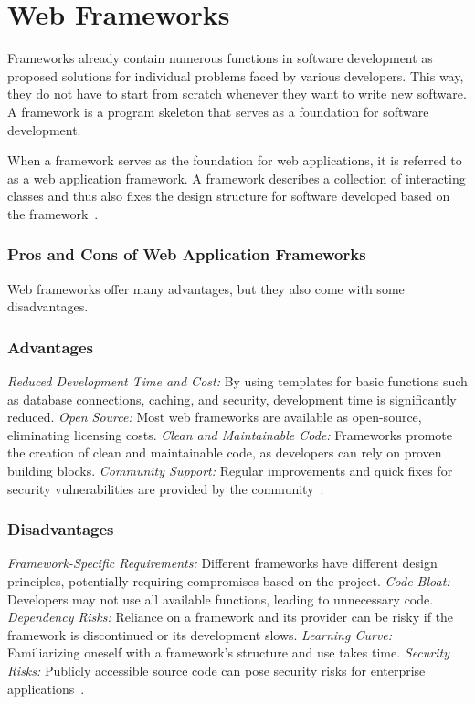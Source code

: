 \section{Web Frameworks}

Frameworks already contain numerous functions in software development as proposed solutions for individual problems faced by various developers. This way, they do not have to start from scratch whenever they want to write new software. A framework is a program skeleton that serves as a foundation for software development.

When a framework serves as the foundation for web applications, it is referred to as a web application framework. A framework describes a collection of interacting classes and thus also fixes the design structure for software developed based on the framework~\cite{ionos_webframeworks}.
\subsubsection{Pros and Cons of Web Application Frameworks}
Web frameworks offer many advantages, but they also come with some disadvantages.

\subsubsection{Advantages}

\textit{Reduced Development Time and Cost:} By using templates for basic functions such as database connections, caching, and security, development time is significantly reduced.
\newline\textit{Open Source:} Most web frameworks are available as open-source, eliminating licensing costs.
\newline\textit{Clean and Maintainable Code:} Frameworks promote the creation of clean and maintainable code, as developers can rely on proven building blocks.
\newline\textit{Community Support:} Regular improvements and quick fixes for security vulnerabilities are provided by the community~\cite{ionos_webframeworks}.

\subsubsection{Disadvantages}

\textit{Framework-Specific Requirements:} Different frameworks have different design principles, potentially requiring compromises based on the project.
\newline\textit{Code Bloat:} Developers may not use all available functions, leading to unnecessary code.
\newline\textit{Dependency Risks:} Reliance on a framework and its provider can be risky if the framework is discontinued or its development slows.
\newline\textit{Learning Curve:} Familiarizing oneself with a framework’s structure and use takes time.
\newline\textit{Security Risks:} Publicly accessible source code can pose security risks for enterprise applications~\cite{ionos_webframeworks}.

